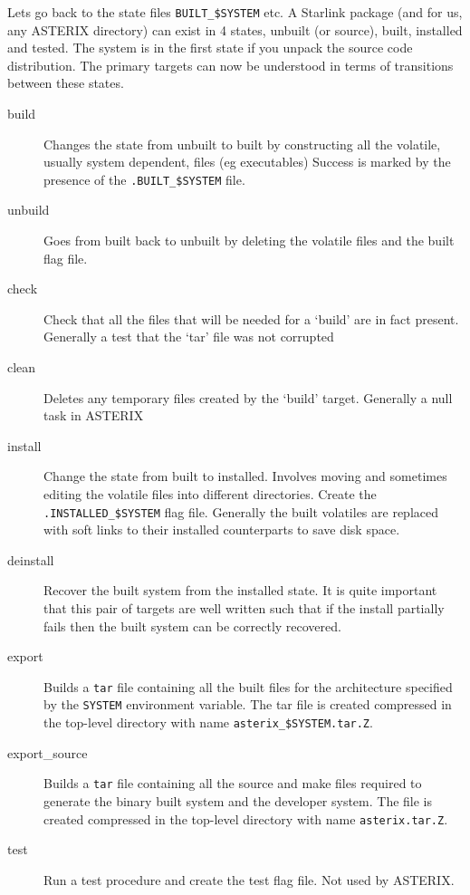 Lets go back to the state files \verb+BUILT_$SYSTEM+ etc. A Starlink
package (and for us, any ASTERIX directory) can exist in 4 states, unbuilt
(or source), built, installed and tested. The system is in the first state
if you unpack the source code distribution. The primary targets can now
be understood in terms of transitions between these states. 
\begin{description}
\item[build] Changes the state from unbuilt to built by constructing 
  all the volatile, usually system dependent, files (eg executables)
  Success is marked by the presence of the \verb+.BUILT_$SYSTEM+ file.
  
\item[unbuild] Goes from built back to unbuilt by deleting the volatile
  files and the built flag file.
  
\item[check] Check that all the files that will be needed for a `build'
  are in fact present. Generally a test that the `tar' file was not
  corrupted
  
\item[clean] Deletes any temporary files created by the `build' target. 
  Generally a null task in ASTERIX

\item[install] Change the state from built to installed. Involves moving
  and sometimes editing the volatile files into different directories.
  Create the \verb+.INSTALLED_$SYSTEM+ flag file. Generally the built
  volatiles are replaced with soft links to their installed counterparts
  to save disk space.
  
\item[deinstall] Recover the built system from the installed state. It
  is quite important that this pair of targets are well written such 
  that if the install partially fails then the built system can be
  correctly recovered.

\item[export] Builds a \verb+tar+ file containing all the built files for
  the architecture specified by the \verb+SYSTEM+ environment variable.
  The tar file is created compressed in the top-level directory with 
  name \verb+asterix_$SYSTEM.tar.Z+.
  
\item[export\_source] Builds a \verb+tar+ file containing all the source
  and make files required to generate the binary built system and the
  developer system. The file is created compressed in the top-level 
  directory with name \verb+asterix.tar.Z+.
  
\item[test] Run a test procedure and create the test flag file. Not used
  by ASTERIX.

\end{description}
